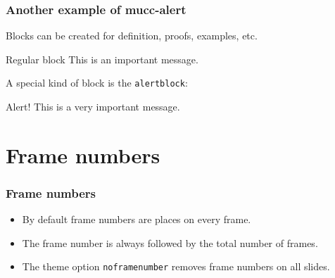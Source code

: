 \documentclass[aspectratio=169]{beamer}
\begin{document}
\begin{frame}
    \frametitle{Another example of mucc-alert}
    Blocks can be created for definition, proofs, examples, etc.
    \begin{block}{Regular block}
        This is an important message.
    \end{block}
    \vspace{.5cm}
    \pause
    A special kind of block is the \texttt{alertblock}:
    \begin{alertblock}{Alert!}
        This is a very important message.
    \end{alertblock}
\end{frame}


\section{Frame numbers}

\begin{frame}
    \frametitle{Frame numbers}
    \begin{itemize}
        \itemsep.25cm
        \item By default frame numbers are places on every frame.
        \item The frame number is always followed by the total number of frames.
        \item The theme option \texttt{noframenumber} removes frame numbers on all slides.
    \end{itemize}
\end{frame}

\titleframe
\end{document}
